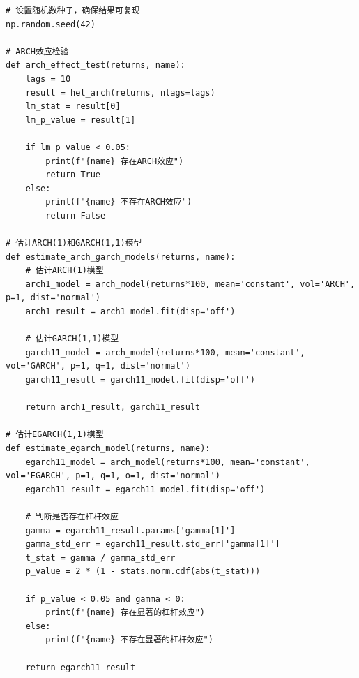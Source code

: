 \documentclass[12pt, a4paper]{article}
\begin{document}
\begin{lstlisting}[basicstyle=\small\ttfamily, breaklines=true, columns=fullflexible]
# 设置随机数种子，确保结果可复现
np.random.seed(42)

# ARCH效应检验
def arch_effect_test(returns, name):
    lags = 10
    result = het_arch(returns, nlags=lags)
    lm_stat = result[0]
    lm_p_value = result[1]
    
    if lm_p_value < 0.05:
        print(f"{name} 存在ARCH效应")
        return True
    else:
        print(f"{name} 不存在ARCH效应")
        return False

# 估计ARCH(1)和GARCH(1,1)模型
def estimate_arch_garch_models(returns, name):
    # 估计ARCH(1)模型
    arch1_model = arch_model(returns*100, mean='constant', vol='ARCH', p=1, dist='normal')
    arch1_result = arch1_model.fit(disp='off')
    
    # 估计GARCH(1,1)模型
    garch11_model = arch_model(returns*100, mean='constant', vol='GARCH', p=1, q=1, dist='normal')
    garch11_result = garch11_model.fit(disp='off')
    
    return arch1_result, garch11_result

# 估计EGARCH(1,1)模型
def estimate_egarch_model(returns, name):
    egarch11_model = arch_model(returns*100, mean='constant', vol='EGARCH', p=1, q=1, o=1, dist='normal')
    egarch11_result = egarch11_model.fit(disp='off')
    
    # 判断是否存在杠杆效应
    gamma = egarch11_result.params['gamma[1]']
    gamma_std_err = egarch11_result.std_err['gamma[1]']
    t_stat = gamma / gamma_std_err
    p_value = 2 * (1 - stats.norm.cdf(abs(t_stat)))
    
    if p_value < 0.05 and gamma < 0:
        print(f"{name} 存在显著的杠杆效应")
    else:
        print(f"{name} 不存在显著的杠杆效应")
    
    return egarch11_result
\end{lstlisting}
\end{document}
